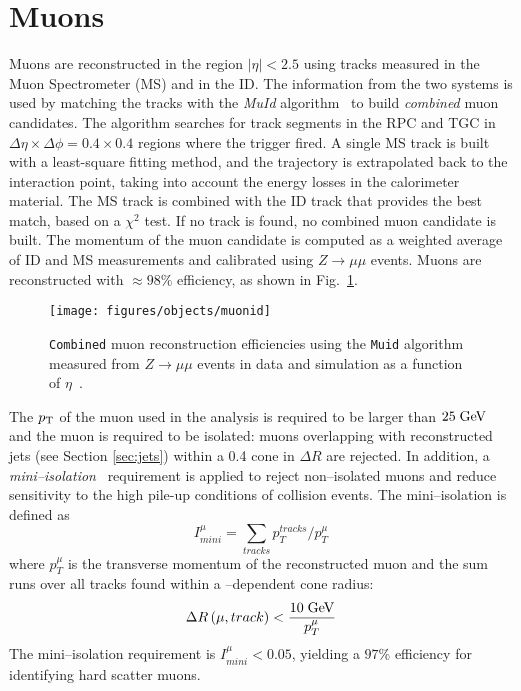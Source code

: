 \section{Muons}
\label{sec:muons}

Muons are reconstructed in the region $|\eta|<2.5$ using tracks
measured in the Muon Spectrometer (MS) and in the ID.
The information from the two systems is used by matching
the tracks with the {\it MuId} algorithm~\cite{muidalgo} to build 
{\it combined} muon candidates.
The algorithm searches for track segments in the RPC and TGC in
$\Delta\eta\times\Delta\phi=0.4\times0.4$ regions where the trigger
fired. A single MS track is built with a least-square fitting method, and
the trajectory is extrapolated back to the interaction point, taking
into account the energy losses in the calorimeter material. 
The MS track is combined with the ID track that provides the best
match, based on a $\chi^2$ test. If no track is found, no combined
muon candidate is built.
The momentum of the muon candidate is computed as a weighted average
of ID and MS measurements and calibrated using $Z\to \mu\mu$ events.
Muons are reconstructed with \mbox{$\approx{}98\%$} efficiency, as shown in
Fig.~\ref{fig:mueff}.

\begin{figure}[htb!]\centering
  \texttt{[image: figures/objects/muonid]}
  \caption{\texttt{Combined} muon reconstruction efficiencies using
    the \texttt{Muid} algorithm measured from $Z\to \mu\mu$ events in
    data and simulation as a function of
    $\eta$~\cite{miniisolation}.} 
  \label{fig:mueff}
\end{figure}

The $p_{\mathrm{T}}$ of the muon used in the analysis is required to be larger
than \mbox{$25 \; \mathrm{GeV}{}$} and the muon is required to be isolated: muons
overlapping with reconstructed jets (see Section \ref{sec:jets})
within a 0.4 cone in $\Delta R$ are rejected. In addition, a {\it
  mini--isolation}~\cite{miniisolation} requirement is applied to
reject non--isolated muons and reduce sensitivity to the high pile-up
conditions of \eighttev{} collision events. The mini--isolation is
defined as
\begin{equation}
I^{\mu}_{mini}=\sum_{tracks}p_T^{tracks}/p_T^{\mu}
\end{equation}
where $p_T^{\mu}$ is the transverse momentum of the reconstructed muon
and the sum runs over all tracks found within a \pt{}--dependent cone
radius:
\begin{equation}
\Delta{}R\left(\mu, track\right)<\frac{10\; \mathrm{GeV}}{p_T^{\mu}}
\end{equation}
The mini--isolation requirement is $I^{\mu}_{mini}<0.05$, yielding
a $97\%$ efficiency for identifying hard scatter muons.

